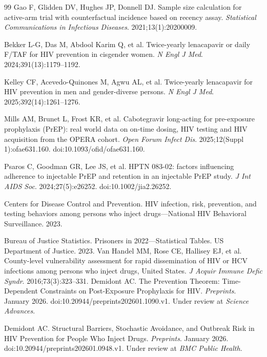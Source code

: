 \documentclass[11pt]{article}
\begin{document}
\begin{thebibliography}{99}
\small
{} Gao F, Glidden DV, Hughes JP, Donnell DJ. Sample size calculation for active-arm trial with counterfactual incidence based on recency assay. \emph{Statistical Communications in Infectious Diseases}. 2021;13(1):20200009.

 Bekker L-G, Das M, Abdool Karim Q, et al. Twice-yearly lenacapavir or daily F/TAF for HIV prevention in cisgender women. \emph{N Engl J Med}. 2024;391(13):1179--1192.

 Kelley CF, Acevedo-Quinones M, Agwu AL, et al. Twice-yearly lenacapavir for HIV prevention in men and gender-diverse persons. \emph{N Engl J Med}. 2025;392(14):1261--1276.

 Mills AM, Brunet L, Frost KR, et al. Cabotegravir long-acting for pre-exposure prophylaxis (PrEP): real world data on on-time dosing, HIV testing and HIV acquisition from the OPERA cohort. \emph{Open Forum Infect Dis}. 2025;12(Suppl 1):ofae631.160. doi:10.1093/ofid/ofae631.160.

 Psaros C, Goodman GR, Lee JS, et al. HPTN 083-02: factors influencing adherence to injectable PrEP and retention in an injectable PrEP study. \emph{J Int AIDS Soc}. 2024;27(5):e26252. doi:10.1002/jia2.26252.

 Centers for Disease Control and Prevention. HIV infection, risk, prevention, and testing behaviors among persons who inject drugs---National HIV Behavioral Surveillance. 2023.

 Bureau of Justice Statistics. Prisoners in 2022---Statistical Tables. US Department of Justice. 2023.
 Van Handel MM, Rose CE, Hallisey EJ, et al. County-level vulnerability assessment for rapid dissemination of HIV or HCV infections among persons who inject drugs, United States. \emph{J Acquir Immune Defic Syndr}. 2016;73(3):323--331.
 Demidont AC. The Prevention Theorem: Time-Dependent Constraints on Post-Exposure Prophylaxis for HIV. \emph{Preprints}. January 2026. doi:10.20944/preprints202601.1090.v1. Under review at \emph{Science Advances}.

 Demidont AC. Structural Barriers, Stochastic Avoidance, and Outbreak Risk in HIV Prevention for People Who Inject Drugs. \emph{Preprints}. January 2026. doi:10.20944/preprints202601.0948.v1. Under review at \emph{BMC Public Health}.
\end{thebibliography}
\end{document}

